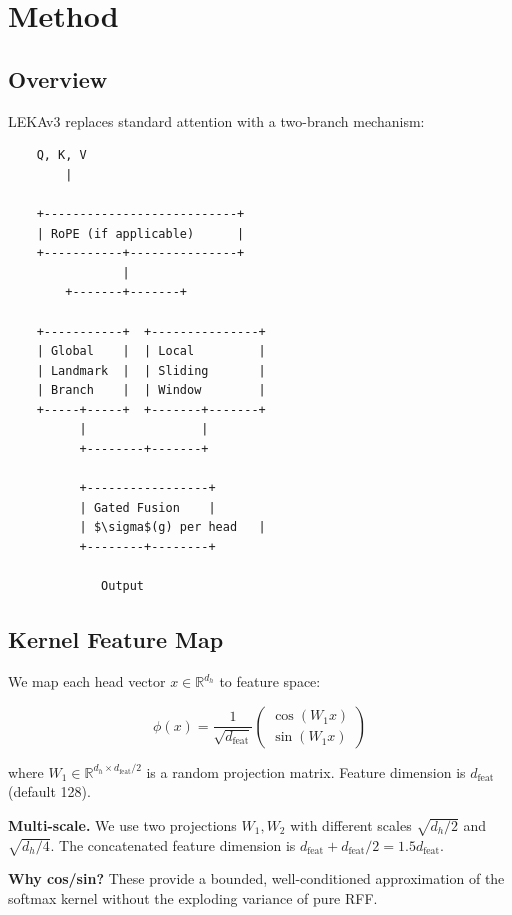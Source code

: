 \section{Method}

\subsection{Overview}

LEKAv3 replaces standard attention with a two-branch mechanism:

\begin{lstlisting}
    Q, K, V
        |
         
    +---------------------------+
    | RoPE (if applicable)      |
    +-----------+---------------+
                |
        +-------+-------+
                         
    +-----------+  +---------------+
    | Global    |  | Local         |
    | Landmark  |  | Sliding       |
    | Branch    |  | Window        |
    +-----+-----+  +-------+-------+
          |                |
          +--------+-------+
                    
          +-----------------+
          | Gated Fusion    |
          | $\sigma$(g) per head   |
          +--------+--------+
                    
             Output
\end{lstlisting}

\subsection{Kernel Feature Map}

We map each head vector $x \in \mathbb{R}^{d_h}$ to feature space:

\[
\phi(x) = \frac{1}{\sqrt{d_\text{feat}}} \begin{pmatrix} \cos(W_1 x) \\ \sin(W_1 x) \end{pmatrix}
\tag{4.1}
\]

where $W_1 \in \mathbb{R}^{d_h \times d_\text{feat}/2}$ is a random 
projection matrix. Feature dimension is $d_\text{feat}$ (default 128).

\textbf{Multi-scale.} We use two projections $W_1, W_2$ with different scales 
$\sqrt{d_h/2}$ and $\sqrt{d_h/4}$. The concatenated feature dimension is 
$d_\text{feat} + d_\text{feat}/2 = 1.5 d_\text{feat}$.

\textbf{Why cos/sin?} These provide a bounded, well-conditioned approximation 
of the softmax kernel without the exploding variance of pure RFF.

